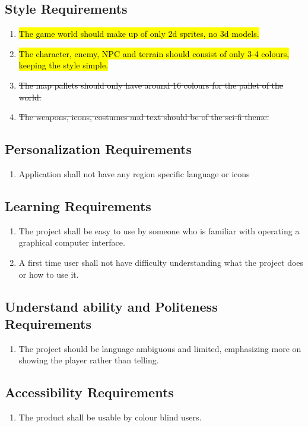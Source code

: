 \documentclass{article}
\begin{document}
\subsection{Style Requirements}
\begin{enumerate}[{SR}1. ]
	\item \hl{The game world should make up of only 2d sprites, no 3d models.}
	\item \hl{The character, enemy, NPC and terrain should consist of only 3-4 colours, keeping the style simple.}
	\item \st{The map pallets should only have around 16 colours for the pallet of the world.}
	\item \st{The weapons, icons, costumes and text should be of the sci-fi theme.}
\end{enumerate}
\subsection{Personalization Requirements}
\begin{enumerate}[{PR}1. ]
	\item Application shall not have any region specific language or icons
\end{enumerate}
\subsection{Learning Requirements}
\begin{enumerate}[{LR}1. ]
	\item The project shall be easy to use by someone who is familiar with operating a graphical computer interface.
	\item A first time user shall not have difficulty understanding what the project does or how to use it.
\end{enumerate}
\subsection{Understand ability and Politeness Requirements}
\begin{enumerate}[{UPR}1. ]
	\item The project should be language ambiguous and limited, emphasizing more on showing the player rather than telling.
\end{enumerate}
\subsection{Accessibility Requirements}
\begin{enumerate}[{AR}1. ]
	\item The product shall be usable by colour blind users.
\end{enumerate}
\end{document}
